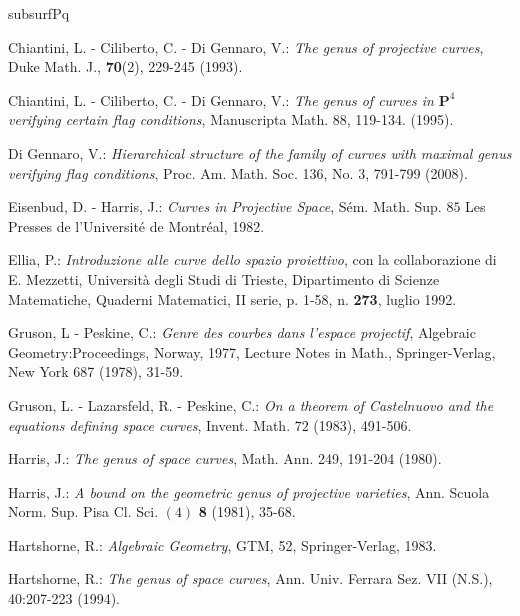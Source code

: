 \documentclass[9pt,a4paper]{amsart}
\theoremstyle{plain}
\theoremstyle{definition}
\theoremstyle{remark}
\begin{document}
\begin{thebibliography}{subsurfPq}


 Chiantini, L. - Ciliberto, C. - Di Gennaro, V.: {\it The genus
of projective curves}, Duke Math. J., {\bf 70}(2), 229-245 (1993).



 Chiantini, L. - Ciliberto, C. - Di Gennaro, V.: {\it The genus of curves in
$\mathbf P^4$ verifying certain flag conditions},
Manuscripta Math. 88, 119-134.
(1995).


 Di Gennaro, V.:
{\it Hierarchical structure of the family of curves with maximal
genus verifying flag conditions}, Proc. Am. Math. Soc. 136, No. 3,
791-799 (2008).

 Eisenbud, D. - Harris, J.: {\it Curves in Projective Space},
S\'em. Math. Sup. $85$ Les Presses de l'Universit\'e de Montr\'eal,
1982.


 Ellia, P.: {\it Introduzione alle curve dello spazio
proiettivo}, con la collaborazione di E. Mezzetti,  Universit\`a
degli Studi di Trieste, Dipartimento di Scienze Matematiche,
Quaderni Matematici, II serie, p. 1-58, n. {\bf{273}}, luglio 1992.


 Gruson, L -  Peskine, C.:
{\it Genre des courbes dans l'espace projectif},
Algebraic Geometry:Proceedings, Norway, 1977, Lecture Notes in Math., Springer-Verlag, New York 687
(1978), 31-59.



 Gruson, L. - Lazarsfeld, R. - Peskine, C.:
{\it On a theorem of Castelnuovo and the equations defining space curves},
Invent. Math. $72$ (1983), 491-506.

 Harris, J.:
{\it The genus of space curves}, Math. Ann. 249, 191-204 (1980).

 Harris, J.: {\it A bound on the geometric genus of projective
varieties}, Ann. Scuola Norm. Sup. Pisa Cl. Sci. $(4)$ {\bf 8}
(1981), 35-68.


 Hartshorne, R.: {\it Algebraic Geometry},
GTM, 52, Springer-Verlag, 1983.


 Hartshorne, R.:
{\it The genus of space curves}, Ann. Univ. Ferrara Sez. VII (N.S.),
40:207-223 (1994).



\end{thebibliography}
\end{document}
